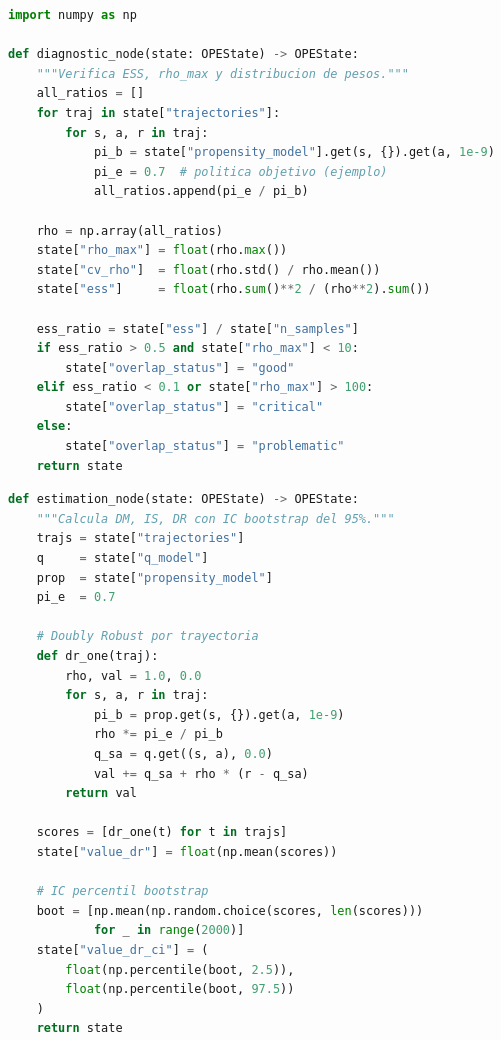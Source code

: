 \begin{lstlisting}[language=python, caption={Nodo de diagnóstico de overlap.}]
import numpy as np

def diagnostic_node(state: OPEState) -> OPEState:
    """Verifica ESS, rho_max y distribucion de pesos."""
    all_ratios = []
    for traj in state["trajectories"]:
        for s, a, r in traj:
            pi_b = state["propensity_model"].get(s, {}).get(a, 1e-9)
            pi_e = 0.7  # politica objetivo (ejemplo)
            all_ratios.append(pi_e / pi_b)

    rho = np.array(all_ratios)
    state["rho_max"] = float(rho.max())
    state["cv_rho"]  = float(rho.std() / rho.mean())
    state["ess"]     = float(rho.sum()**2 / (rho**2).sum())

    ess_ratio = state["ess"] / state["n_samples"]
    if ess_ratio > 0.5 and state["rho_max"] < 10:
        state["overlap_status"] = "good"
    elif ess_ratio < 0.1 or state["rho_max"] > 100:
        state["overlap_status"] = "critical"
    else:
        state["overlap_status"] = "problematic"
    return state
\end{lstlisting}

\begin{lstlisting}[language=python, caption={Nodo de estimación DR con IC bootstrap.}]
def estimation_node(state: OPEState) -> OPEState:
    """Calcula DM, IS, DR con IC bootstrap del 95%."""
    trajs = state["trajectories"]
    q     = state["q_model"]
    prop  = state["propensity_model"]
    pi_e  = 0.7

    # Doubly Robust por trayectoria
    def dr_one(traj):
        rho, val = 1.0, 0.0
        for s, a, r in traj:
            pi_b = prop.get(s, {}).get(a, 1e-9)
            rho *= pi_e / pi_b
            q_sa = q.get((s, a), 0.0)
            val += q_sa + rho * (r - q_sa)
        return val

    scores = [dr_one(t) for t in trajs]
    state["value_dr"] = float(np.mean(scores))

    # IC percentil bootstrap
    boot = [np.mean(np.random.choice(scores, len(scores)))
            for _ in range(2000)]
    state["value_dr_ci"] = (
        float(np.percentile(boot, 2.5)),
        float(np.percentile(boot, 97.5))
    )
    return state
\end{lstlisting}

